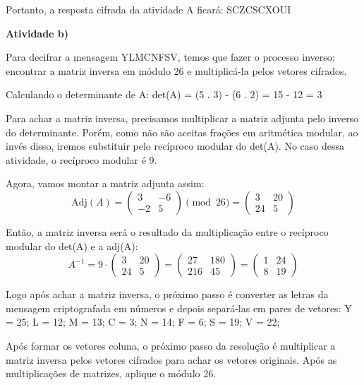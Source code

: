 \documentclass[a4paper,12pt,twocolumn]{article}
\begin{document}
Portanto, a resposta cifrada da atividade A ficará: SCZCSCXOUI

\vspace{0.5cm}
\textbf{Atividade b)}

Para decifrar a mensagem YLMCNFSV, temos que fazer o processo inverso: encontrar a matriz inversa em módulo 26 e multiplicá-la pelos vetores cifrados.

Calculando o determinante de A:
det(A) = (5 . 3) - (6 . 2) = 15 - 12 = 3

Para achar a matriz inversa, precisamos multiplicar a matriz adjunta pelo inverso do determinante. Porém, como não são aceitas frações em aritmética modular, ao invés disso, iremos substituir pelo recíproco modular do det(A). No caso dessa atividade, o recíproco modular é 9.

Agora, vamos montar a matriz adjunta assim:
\begin{equation}
\text{Adj}(A) = \begin{pmatrix} 3 & -6 \\ -2 & 5 \end{pmatrix} \pmod{26} = \begin{pmatrix} 3 & 20 \\ 24 & 5 \end{pmatrix}
\end{equation}

Então, a matriz inversa será o resultado da multiplicação entre o recíproco modular do det(A) e a adj(A):
\begin{equation}
A^{-1} = 9 \cdot \begin{pmatrix} 3 & 20 \\ 24 & 5 \end{pmatrix} = \begin{pmatrix} 27 & 180 \\ 216 & 45 \end{pmatrix} = \begin{pmatrix} 1 & 24 \\ 8 & 19 \end{pmatrix}
\end{equation}

Logo após achar a matriz inversa, o próximo passo é converter as letras da mensagem criptografada em números e depois separá-las em pares de vetores:
Y = 25; L = 12; M = 13; C = 3; N = 14; F = 6; S = 19; V = 22;

Após formar os vetores coluna, o próximo passo da resolução é multiplicar a matriz inversa pelos vetores cifrados para achar os vetores originais. Após as multiplicações de matrizes, aplique o módulo 26.
\end{document}
